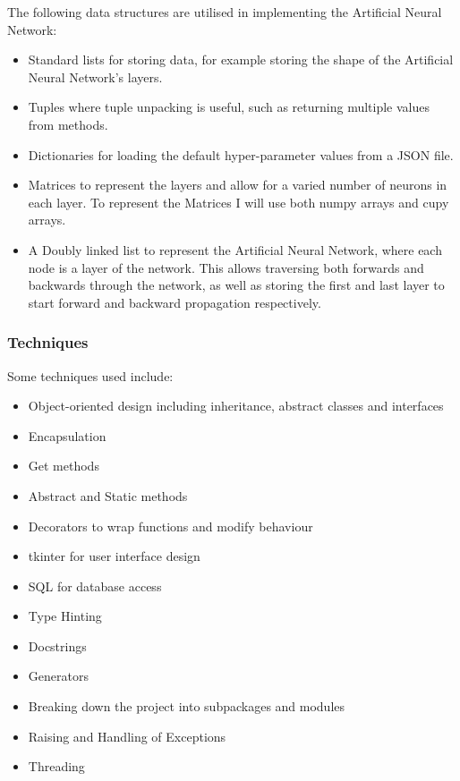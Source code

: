 \documentclass[./project-report/src/latex/project-report.tex]{subfiles}
\begin{document}
The following data structures are utilised in implementing the Artificial Neural Network:

\begin{itemize}
    \item Standard lists for storing data, for example storing the shape of the Artificial Neural Network's layers.
    \item Tuples where tuple unpacking is useful, such as returning multiple values from methods.
    \item Dictionaries for loading the default hyper-parameter values from a JSON file.
    \item Matrices to represent the layers and allow for a varied number of neurons in each layer. To represent the Matrices I will use both numpy arrays and cupy 
          arrays.
    \item A Doubly linked list to represent the Artificial Neural Network, where each node is a layer of the network. This allows traversing both forwards and 
          backwards through the network, as well as storing the first and last layer to start forward and backward propagation respectively.
\end{itemize}

\subsubsection{Techniques}

Some techniques used include:

\begin{itemize}
    \item Object-oriented design including inheritance, abstract classes and interfaces
    \item Encapsulation
	\item Get methods
	\item Abstract and Static methods
    \item Decorators to wrap functions and modify behaviour
    \item tkinter for user interface design
    \item SQL for database access
	\item Type Hinting
	\item Docstrings
	\item Generators
	\item Breaking down the project into subpackages and modules
	\item Raising and Handling of Exceptions
	\item Threading
\end{itemize}
\end{document}
